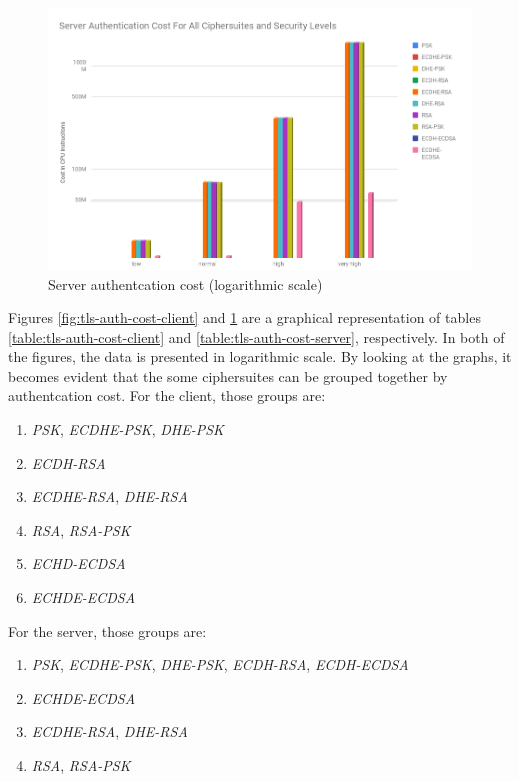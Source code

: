 \documentclass{llncs}
\begin{document}
\begin{figure}
  \centering
  \includegraphics[width=1.0\textwidth]{img/tls-server-auth-cost.png}
  \centering \caption{\label{fig:tls-auth-cost-server} Server authentcation cost (logarithmic scale)}
\end{figure}


Figures \ref{fig:tls-auth-cost-client} and \ref{fig:tls-auth-cost-server} are a graphical representation of tables \ref{table:tls-auth-cost-client} and \ref{table:tls-auth-cost-server},
respectively. In both of the figures, the data is presented in logarithmic scale. By looking at the graphs, it becomes evident that the some ciphersuites can be grouped together by authentcation cost.
For the client, those groups are:

\begin{enumerate}
  \item \textit{PSK}, \textit{ECDHE-PSK}, \textit{DHE-PSK}
  \item \textit{ECDH-RSA}
  \item \textit{ECDHE-RSA}, \textit{DHE-RSA}
  \item \textit{RSA}, \textit{RSA-PSK}
  \item \textit{ECHD-ECDSA}
  \item \textit{ECHDE-ECDSA}
\end{enumerate}

For the server, those groups are:

\begin{enumerate}
  \item \textit{PSK}, \textit{ECDHE-PSK}, \textit{DHE-PSK}, \textit{ECDH-RSA}, \textit{ECDH-ECDSA}
  \item \textit{ECHDE-ECDSA}
  \item \textit{ECDHE-RSA}, \textit{DHE-RSA}
  \item \textit{RSA}, \textit{RSA-PSK}
\end{enumerate}
\end{document}
